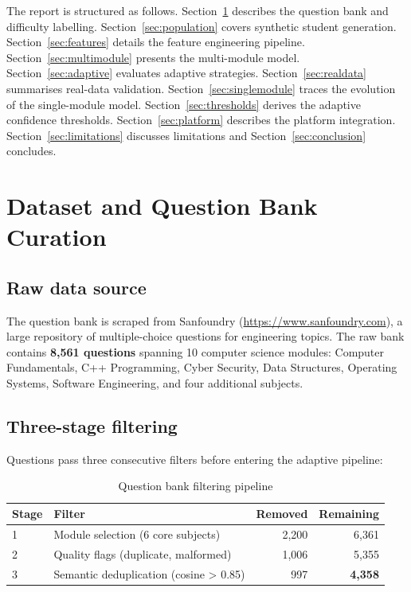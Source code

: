 \documentclass[12pt,a4paper]{article}
\begin{document}
The report is structured as follows.
Section~\ref{sec:data} describes the question bank and difficulty labelling.
Section~\ref{sec:population} covers synthetic student generation.
Section~\ref{sec:features} details the feature engineering pipeline.
Section~\ref{sec:multimodule} presents the multi-module model.
Section~\ref{sec:adaptive} evaluates adaptive strategies.
Section~\ref{sec:realdata} summarises real-data validation.
Section~\ref{sec:singlemodule} traces the evolution of the single-module model.
Section~\ref{sec:thresholds} derives the adaptive confidence thresholds.
Section~\ref{sec:platform} describes the platform integration.
Section~\ref{sec:limitations} discusses limitations and Section~\ref{sec:conclusion}
concludes.

\section{Dataset and Question Bank Curation}
\label{sec:data}

\subsection{Raw data source}

The question bank is scraped from Sanfoundry (\url{https://www.sanfoundry.com}), a
large repository of multiple-choice questions for engineering topics.
The raw bank contains \textbf{8,561 questions} spanning 10 computer science modules:
Computer Fundamentals, C++ Programming, Cyber Security, Data Structures,
Operating Systems, Software Engineering, and four additional subjects.

\subsection{Three-stage filtering}

Questions pass three consecutive filters before entering the adaptive pipeline:

\begin{table}[H]
\centering
\caption{Question bank filtering pipeline}
\begin{tabular}{@{}llrr@{}}
\toprule
Stage & Filter & Removed & Remaining \\
\midrule
1 & Module selection (6 core subjects) & 2,200 & 6,361 \\
2 & Quality flags (duplicate, malformed) & 1,006 & 5,355 \\
3 & Semantic deduplication (cosine > 0.85) & 997  & \textbf{4,358} \\
\bottomrule
\end{tabular}
\end{table}
\end{document}
